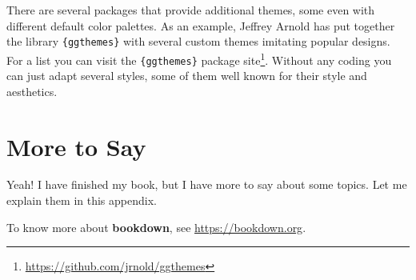 \documentclass[
]{krantz}
\renewcommand{\href}[2]{#2\footnote{\url{#1}}}
\begin{document}
There are several packages that provide additional themes, some even with different default color palettes. As an example, Jeffrey Arnold has put together the library \texttt{\{ggthemes\}} with several custom themes imitating popular designs. For a list you can visit the \href{https://github.com/jrnold/ggthemes}{\texttt{\{ggthemes\}} package site}. Without any coding you can just adapt several styles, some of them well known for their style and aesthetics.

\cleardoublepage

\hypertarget{appendix-appendix}{%
\appendix {}}


\hypertarget{more-to-say}{%
\chapter{More to Say}\label{more-to-say}}

Yeah! I have finished my book, but I have more to say about some topics. Let me explain them in this appendix.

To know more about \textbf{bookdown}, see \url{https://bookdown.org}.

  

\backmatter
\printindex
\end{document}
